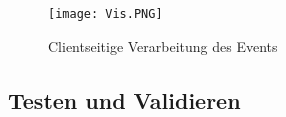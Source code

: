 \\\\  
\begin{figure}[h!]
	\centering
		\texttt{[image: Vis.PNG]}        
		\caption{Clientseitige Verarbeitung des Events}
	\label{addEventClient}
\end{figure} 
\newpage
\subsection{Testen und Validieren}
